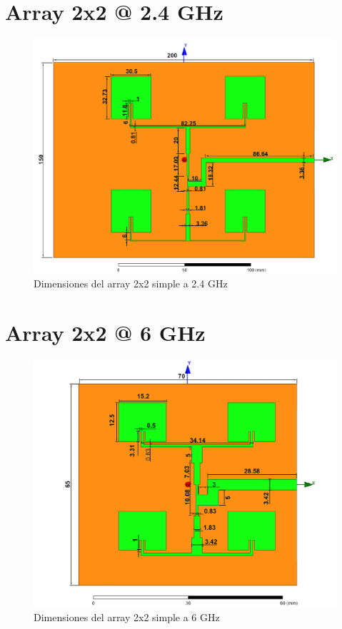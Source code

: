 \section{Array 2x2 @ 2.4 GHz}
\vfill
\begin{figure}[H]
   	 \centering
        \includegraphics[width=\textwidth ,height=\textheight, keepaspectratio=true]{archivos/desarrollo/autocad/7}
        \caption{Dimensiones del array 2x2 simple a 2.4 GHz}
        \label{fig:2x21}
\end{figure}
\vfill
\newpage

\section{Array 2x2 @ 6 GHz}
\vfill
\begin{figure}[H]
   	 \centering
        \includegraphics[width=\textwidth ,height=\textheight, keepaspectratio=true]{archivos/desarrollo/autocad/8}
        \caption{Dimensiones del array 2x2 simple a 6 GHz}
        \label{fig:2x22}
\end{figure}
\vfill
\newpage

